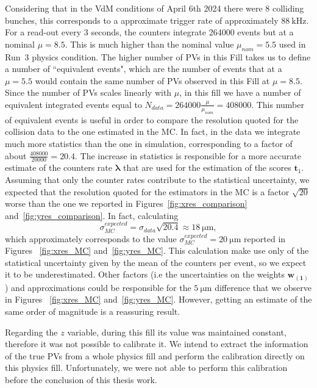 Considering that in the VdM conditions of April 6th 2024 there were 8 colliding bunches, this corresponds to a approximate trigger rate of approximately $\SI{88}{\kilo\hertz}$. For a read-out every 3 seconds, the counters integrate 264000 events but at a nominal $\mu=8.5$. This is much higher than the nominal value  $\mu_{nom}=5.5$ used  in Run~3 physics condition. The higher number of PVs in this Fill takes us to define a number of ``equivalent events", which are the number of events that at a $\mu=5.5$ would contain the same number of PVs observed in this Fill at $\mu=8.5$. Since the number of PVs scales linearly with $\mu$, in this fill we have a number of equivalent integrated events equal to $N_{data}=264000\tfrac{\mu}{\mu_{nom}}=408000$. This number of equivalent events is useful in order to compare the resolution quoted for the collision data to the one estimated in the MC. In fact, in the data we integrate much more statistics than the one in simulation, corresponding to a factor of about $\tfrac{408000}{20000}=20.4$.  The increase in statistics is responsible for a more accurate estimate of the counters rate $\mathbf{\lambda}$ that are used for the estimation of the scores $\mathbf{t}_{1}$. Assuming that only the counter rates contribute to the statistical uncertainty, we expected that the resolution quoted for the estimators in the MC is a factor $\sqrt{20}$ worse than the one we reported in Figures~\ref{fig:xres_comparison} and~\ref{fig:yres_comparison}. In fact, calculating
\begin{equation}
    \sigma_{MC}^{expected} = \sigma_{data}\sqrt{20.4} \approx \SI{18}{\micro\meter},
\end{equation}
which approximately corresponds to the value $\sigma_{MC}^{expected}=\SI{20}{\micro\meter}$ reported in Figures ~\ref{fig:xres_MC} and~\ref{fig:yres_MC}. This calculation make use only of the statistical uncertainty given by the mean of the counters per event, so we expect it to be underestimated. Other factors (i.e the uncertainties on the weights $\mathbf{w_{(1)}}$) and approximations could be responsible for the $\SI{5}{\micro\meter}$ difference that we observe in Figures ~\ref{fig:xres_MC} and~\ref{fig:yres_MC}. However, getting an estimate of the same order of magnitude is a reassuring result.

Regarding the $z$ variable, during this fill its value was maintained constant, therefore it was not possible to calibrate it. We intend to extract the information of the true PVs from a whole physics fill and perform the calibration directly on this physics fill. Unfortunately, we were not able to perform this calibration before the conclusion of this thesis work. 


